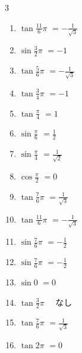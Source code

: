 \begin{multicols}{3}
\begin{enumerate}
\columnbreak %

\resetques

  \item $\displaystyle \tan{\frac{11}{6}\pi}$
        $\displaystyle =-\frac{1}{\sqrt{3}}$

  \item $\displaystyle \sin{\frac{3}{2}\pi}$
        $\displaystyle =-1$

  \item $\displaystyle \tan{\frac{5}{6}\pi}$
        $\displaystyle =-\frac{1}{\sqrt{3}}$

  \item $\displaystyle \tan{\frac{3}{4}\pi}$
        $\displaystyle =-1$

  \item $\displaystyle \tan{\frac{\pi}{4}}$
        $\displaystyle =1$

  \item $\displaystyle \sin{\frac{\pi}{6}}$
        $\displaystyle =\frac{1}{2}$

  \item $\displaystyle \sin{\frac{\pi}{4}}$
        $\displaystyle =\frac{1}{\sqrt{2}}$

  \item $\displaystyle \cos{\frac{\pi}{2}}$
        $\displaystyle =0$

  \item $\displaystyle \tan{\frac{7}{6}\pi}$
        $\displaystyle =\frac{1}{\sqrt{3}}$

  \item $\displaystyle \tan{\frac{11}{6}\pi}$
        $\displaystyle =-\frac{1}{\sqrt{3}}$

  \item $\displaystyle \sin{\frac{7}{6}\pi}$
        $\displaystyle =-\frac{1}{2}$

  \item $\displaystyle \sin{\frac{7}{6}\pi}$
        $\displaystyle =-\frac{1}{2}$

  \item $\displaystyle \sin{0}$
        $\displaystyle =0$

  \item $\displaystyle \tan{\frac{3}{2}\pi}$
        $\displaystyle \quad なし$

  \item $\displaystyle \tan{\frac{7}{6}\pi}$
        $\displaystyle =\frac{1}{\sqrt{3}}$

  \item $\displaystyle \tan{2\pi}$
        $\displaystyle =0$


\end{enumerate}
\end{multicols}
